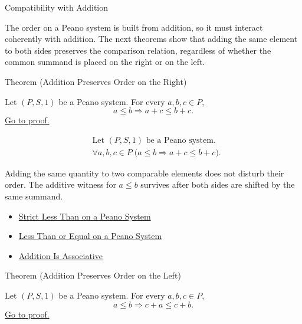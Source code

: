 \begin{topicbox}{Compatibility with Addition}
\begin{exposition}
The order on a Peano system is built from addition, so it must interact
coherently with addition. The next theorems show that adding the same element
to both sides preserves the comparison relation, regardless of whether the
common summand is placed on the right or on the left.
\end{exposition}

\begin{theorembox}{Theorem (Addition Preserves Order on the Right)}
\begin{theorem}
\label{thm:addition-preserves-order-on-right}
Let $(P,S,1)$ be a Peano system. For every $a,b,c \in P$,
\[
a \le b
\Longrightarrow
a+c \le b+c.
\]
\hyperref[prf:addition-preserves-order-on-right]{Go to proof.}
\end{theorem}
\end{theorembox}

\begin{remark*}
\[
\begin{aligned}
&\text{Let } (P,S,1) \text{ be a Peano system.}\\
&\forall a,b,c \in P\;
\bigl(a \le b \Longrightarrow a+c \le b+c\bigr).
\end{aligned}
\]
\end{remark*}

\begin{remark*}[Interpretation]
Adding the same quantity to two comparable elements does not disturb their
order. The additive witness for $a \le b$ survives after both sides are shifted
by the same summand.
\end{remark*}

\begin{dependencies}
\begin{itemize}
  \item \hyperref[def:strict-less-than-on-peano-system]{Strict Less Than on a Peano System}
  \item \hyperref[def:less-than-or-equal-on-peano-system]{Less Than or Equal on a Peano System}
  \item \hyperref[thm:addition-associative]{Addition Is Associative}
\end{itemize}
\end{dependencies}

\begin{theorembox}{Theorem (Addition Preserves Order on the Left)}
\begin{theorem}
\label{thm:addition-preserves-order-on-left}
Let $(P,S,1)$ be a Peano system. For every $a,b,c \in P$,
\[
a \le b
\Longrightarrow
c+a \le c+b.
\]
\hyperref[prf:addition-preserves-order-on-left]{Go to proof.}
\end{theorem}
\end{theorembox}


\end{topicbox}
